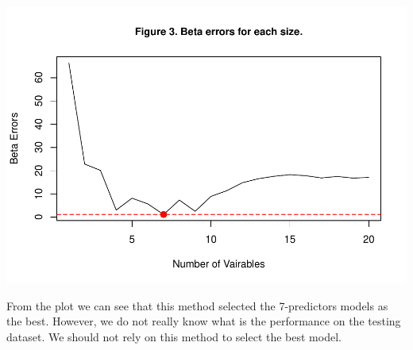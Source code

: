 \documentclass[
]{article}
\begin{document}
\includegraphics[width=0.5\linewidth,height=0.5\textheight]{Homework_10_Pan_files/figure-latex/unnamed-chunk-11-1}

From the plot we can see that this method selected the 7-predictors
models as the best. However, we do not really know what is the
performance on the testing dataset. We should not rely on this method to
select the best model.
\end{document}
